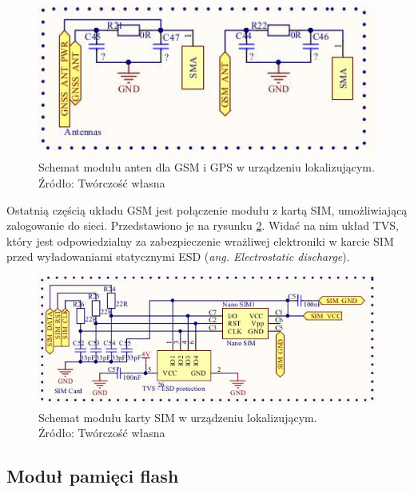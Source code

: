 \begin{figure}[H]
	\centering
	\includegraphics[width=15cm]{img/schematics/mainboard_functional_gps_gsm_antennas.jpg}
	\caption{Schemat modułu anten dla GSM i GPS w urządzeniu lokalizującym. \\ Źródło: Twórczość własna}
	\label{fig:image_mainboard_functional_gps_gsm_antennas}
\end{figure}

Ostatnią częścią układu GSM jest połączenie modułu z kartą SIM, umożliwiającą zalogowanie do sieci. Przedstawiono je na rysunku \ref{fig:image_mainboard_functional_gsm_sim_card}. Widać na nim układ TVS, który jest odpowiedzialny za zabezpieczenie wrażliwej elektroniki w karcie SIM przed wyładowaniami statycznymi ESD (\textit{ang. Electrostatic discharge}).

\begin{figure}[H]
	\centering
	\includegraphics[width=15cm]{img/schematics/mainboard_gsm_sim_card.jpg}
	\caption{Schemat modułu karty SIM w urządzeniu lokalizującym. \\ Źródło: Twórczość własna}
	\label{fig:image_mainboard_functional_gsm_sim_card}
\end{figure}

\subsection{Moduł pamięci flash}

